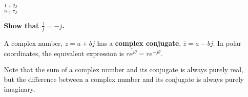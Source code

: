 \begin{enumerate}
\begin{enumerate}

\qitem $\frac{1+2j}{9+7j}$

\ws{
  \vspace{120px}
}


\end{enumerate}


\qitem \textbf{Show that $\frac{1}{j} = -j$.}

\ws{
  \vspace{120px}
}


\end{enumerate}

A complex number, $z = a + bj$ has a \textbf{complex conjugate}, $\overline{z} = a - bj$. In polar coordinates, the equivalent expression is $\overline{re^{j\theta}} = re^{-j\theta}$.

Note that the sum of a complex number and its conjugate is always purely real, but the difference between a complex number and its conjugate is always purely imaginary.


